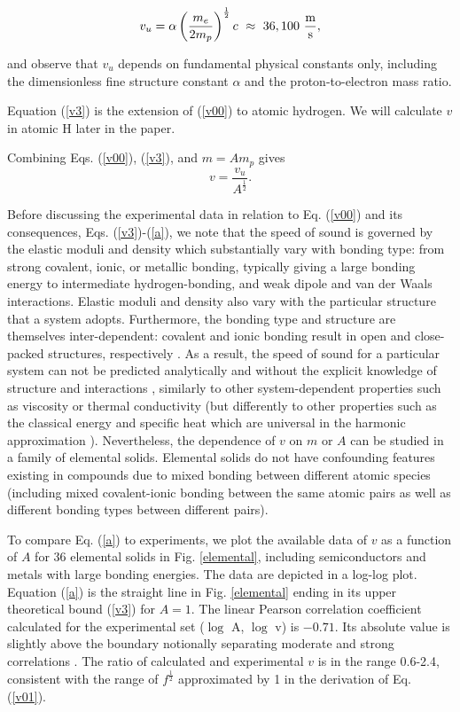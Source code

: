 \documentclass[aps,prl,groupedaddress,fleqn,twocolumn,10pt]{revtex4-1}
\begin{document}
\begin{equation}
v_u=\alpha\left(\frac{m_e}{2m_p}\right)^{\frac{1}{2}}c~\approx~36,100~\frac{\rm m}{\rm s},
\label{v3}
\end{equation}

\noindent and observe that $v_u$ depends on fundamental physical constants only, including the dimensionless fine structure constant $\alpha$ and the proton-to-electron mass ratio.

Equation (\ref{v3}) is the extension of (\ref{v00}) to atomic hydrogen. We will calculate $v$ in atomic H later in the paper.

Combining Eqs. (\ref{v00}), (\ref{v3}), and $m=Am_p$ gives
\begin{equation}
v=\frac{v_u}{A^\frac{1}{2}}.
\label{a}
\end{equation}

Before discussing the experimental data in relation to Eq. (\ref{v00}) and its consequences, Eqs. (\ref{v3})-(\ref{a}), we note that the speed of sound is governed by the elastic moduli and density which substantially vary with bonding type: from strong covalent, ionic, or metallic bonding, typically giving a large bonding energy to intermediate hydrogen-bonding, and weak dipole and van der Waals interactions. Elastic moduli and density also vary with the particular structure that a system adopts. Furthermore, the bonding type and structure are themselves inter-dependent: covalent and ionic bonding result in open and close-packed structures, respectively \cite{phillips}. As a result, the speed of sound for a particular system can not be predicted analytically and without the explicit knowledge of structure and interactions \cite{zaccone}, similarly to other system-dependent properties such as viscosity or thermal conductivity (but differently to other properties such as the classical energy and specific heat which are universal in the harmonic approximation \cite{landau}). Nevertheless, the dependence of $v$ on $m$ or $A$ can be studied in a family of elemental solids. Elemental solids do not have confounding features existing in compounds due to mixed bonding between different atomic species (including mixed covalent-ionic bonding between the same atomic pairs as well as different bonding types between different pairs).

To compare Eq. (\ref{a}) to experiments, we plot the available data of $v$ as a function of $A$ for 36 elemental solids \cite{handbook,handbook1,handbook2} in Fig. \ref{elemental}, including semiconductors and metals with large bonding energies. The data are depicted in a log-log plot. Equation (\ref{a}) is the straight line in Fig. \ref{elemental} ending in its upper theoretical bound (\ref{v3}) for $A=1$. The linear Pearson correlation coefficient calculated for the experimental set ($\log$ A, $\log$ v) is $-0.71$. Its absolute value is slightly above the boundary notionally separating moderate and strong correlations \cite{correlation}. The ratio of calculated and experimental $v$ is in the range 0.6-2.4, consistent with the range of $f^\frac{1}{2}$ approximated by 1 in the derivation of Eq. (\ref{v01}).
\end{document}
